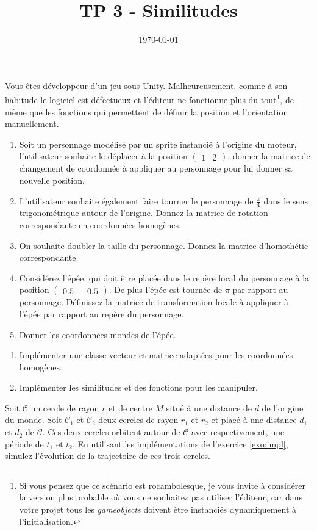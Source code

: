 \documentclass[a4paper,12pt]{article}
\title{TP 3 - Similitudes}
\author{}
\date{\today}
\begin{document}
\makeonlytitle


\label{exo:theorique}

Vous êtes développeur d'un jeu sous Unity. Malheureusement, comme à son habitude le logiciel est défectueux et l'éditeur ne fonctionne plus du tout\footnote{Si vous pensez que ce scénario est rocambolesque, je vous invite à considérer la version plus probable où vous ne souhaitez pas utiliser l'éditeur, car dans votre projet tous les \textit{gameobjects} doivent être instanciés dynamiquement à l'initialisation.}, de même que les fonctions qui permettent de définir la position et l'orientation manuellement.  

\begin{enumerate}
  \item Soit un personnage modélisé par un sprite instancié à l'origine du moteur, l'utilisateur souhaite le déplacer à la position $\begin{pmatrix} 1 & 2\end{pmatrix}$, donner la matrice de changement de coordonnée à appliquer au personnage pour lui donner sa nouvelle position.
  \item L'utilisateur souhaite également faire tourner le personnage de \(\frac{\pi}{4}\) dans le sens trigonométrique autour de l'origine. Donnez la matrice de rotation correspondante en coordonnées homogènes.
  \item On souhaite doubler la taille du personnage. Donnez la matrice d'homothétie correspondante.
  \item Considérez l'épée, qui doit être placée dans le repère local du personnage à la position $\begin{pmatrix} 0.5 & -0.5 \end{pmatrix}$. De plus l'épée est tournée de $\pi$ par rapport au personnage. Définissez la matrice de transformation locale à appliquer à l'épée par rapport au repère du personnage.
  \item Donner les coordonnées mondes de l'épée.
\end{enumerate}

\label{exo:impl}


\begin{enumerate}
  \item Implémenter une classe vecteur et matrice adaptées pour les coordonnées homogènes.
  \item Implémenter les similitudes et des fonctions pour les manipuler.
\end{enumerate}


Soit $\mathcal{C}$ un cercle de rayon $r$ et de centre $M$ situé à une distance de $d$ de l'origine du monde. Soit $\mathcal{C}_1$ et $\mathcal{C}_2$ deux cercles de rayon $r_1$ et $r_2$ et placé à une distance $d_1$ et $d_2$ de $\mathcal{C}$. Ces deux cercles orbitent autour de $\mathcal{C}$ avec respectivement, une période de $t_1$ et $t_2$.
En utilisant les implémentations de l'exercice \ref{exo:impl}, simulez l'évolution de la trajectoire de ces trois cercles.
\end{document}
